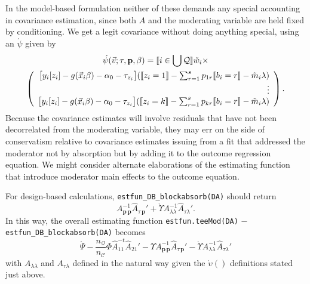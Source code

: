 \documentclass{article}
\DeclarePairedDelimiter{\indicator}{\llbracket}{\rrbracket}
\newcommand{\owt}[1][{[z_{i}]}]{\ensuremath{\check{w}_{i#1}}}
\newcommand{\AbsorbInterceptsEF}{\Upsilon}
\newcommand{\absorbModeratorEF}{\grave{\upsilon}}
\newcommand{\AbsorbModeratorEF}{\grave{\Upsilon}}
\begin{document}
In the model-based formulation neither of these demands any special
accounting in covariance estimation, since both $A$ and the moderating
variable are held fixed by conditioning. We get a legit covariance
without doing anything special, using an $\acute{\psi}$ given by
\begin{multline*}
  \acute{\psi}(\vec{v}; \tau, \mathbf{p}, \beta) =
    \indicator{i \in \bigcup \mathcal{Q}}\owt[] \times \\
\left(
  \begin{array}{r}
    \big[y_{i}[z_{i}]
    -
    g(\vec{x}_{i}\beta)-\alpha_{0}-\tau_{z_{i}}\big]
    (
    \indicator{z_{i}=1}-
    \sum_{r=1}^{s}p_{1r}\indicator{b_{i}=r}
    - \tilde{m}_{i}\lambda)\\
    \vdots \\
    {}\big[y_{i}[z_{i}]
    - g(\vec{x}_{i}\beta) -\alpha_{0} -
    \tau_{z_{i}}\big]
    (
    \indicator{z_{i}=k}
    -
    \sum_{r=1}^{s}p_{kr}\indicator{b_{i}=r}
    -
    \tilde{m}_{i}\lambda)\\
  \end{array}
\right) .
\end{multline*}
Because the covariance estimates will
involve residuals that have not been decorrelated from the moderating
variable, they may err on the side of conservatism relative to
covariance estimates issuing from a fit that addressed the moderator
not by absorption but by adding it to the outcome regression
equation. We might consider alternate elaborations of the estimating
function that introduce moderator main effects to the outcome equation.

For design-based calculations, \texttt{estfun\_DB\_blockabsorb(DA)}
 should return
 \begin{equation*}
   A_{\mathbf{p}\,\mathbf{p}}^{-1}\hat{A}_{\tau\,\mathbf{p}}' +
  \AbsorbModeratorEF{}A_{\lambda \lambda}^{-1}\hat{A}_{\tau \lambda}'.
 \end{equation*}
 In this way, the overall estimating function
 \texttt{estfun.teeMod(DA)} $-$ \texttt{estfun\_DB\_blockabsorb(DA)}
 becomes
 \begin{equation}
   \label{eq:19}
  \acute{\Psi} -
  \frac{n_{\mathcal{Q}}}{n_{\mathcal{C}}}\Phi
  \hat{A}_{11}^{-t}\hat{A}_{21}' - \AbsorbInterceptsEF{}
  A_{\mathbf{p}\,\mathbf{p}}^{-1}\hat{A}_{\tau\,\mathbf{p}}' -
  \AbsorbModeratorEF{}A_{\lambda \lambda}^{-1}\hat{A}_{\tau \lambda}'
 \end{equation}
with $A_{\lambda \lambda}$ and $A_{\tau \lambda}$ defined in the natural
way given the $\absorbModeratorEF()$ definitions stated just above.


\end{document}
